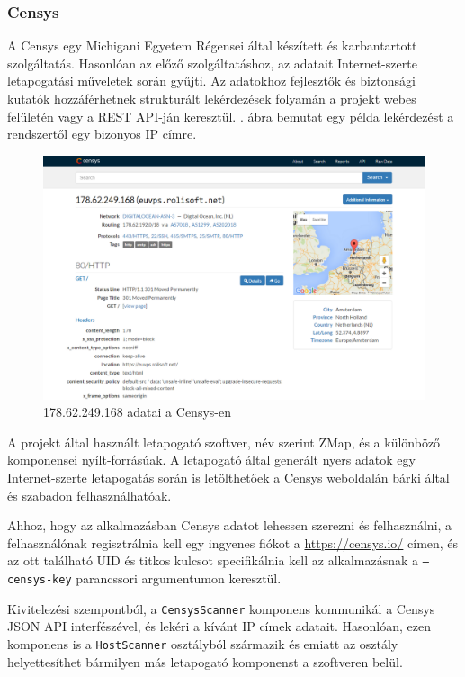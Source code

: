 \subsubsection*{Censys} \label{ssec:censys}

	A Censys\cite{censys15} egy Michigani Egyetem Régensei által készített és karbantartott szolgáltatás. Hasonlóan az előző szolgáltatáshoz, az adatait Internet-szerte letapogatási műveletek során gyűjti. Az adatokhoz fejlesztők és biztonsági kutatók hozzáférhetnek strukturált lekérdezések folyamán a projekt webes felületén vagy a REST API-ján keresztül. \Az{\ref{censysscr}}. ábra bemutat egy példa lekérdezést a rendszertől egy bizonyos IP címre.
	
	\begin{figure}[!htbp]
		\centering
		\includegraphics[scale=0.355]{censys.png}
		\caption{178.62.249.168 adatai a Censys-en}
		\label{censysscr}
	\end{figure}
	
	A projekt által használt letapogató szoftver, név szerint ZMap\cite{zmap13}, és a különböző komponensei nyílt-forrásúak. A letapogató által generált nyers adatok egy Internet-szerte letapogatás során is letölthetőek a Censys weboldalán bárki által és szabadon felhasználhatóak.
	
	Ahhoz, hogy az alkalmazásban Censys adatot lehessen szerezni és felhasználni, a felhasználónak regisztrálnia kell egy ingyenes fiókot a \url{https://censys.io/} címen, és az ott található UID és titkos kulcsot specifikálnia kell az alkalmazásnak a \texttt{--censys-key} parancssori argumentumon keresztül.
	
	Kivitelezési szempontból, a \texttt{CensysScanner} komponens kommunikál a Censys JSON API interfészével, és lekéri a kívánt IP címek adatait. Hasonlóan, ezen komponens is a \texttt{HostScanner} osztályból származik és emiatt az osztály helyettesíthet bármilyen más letapogató komponenst a szoftveren belül.


